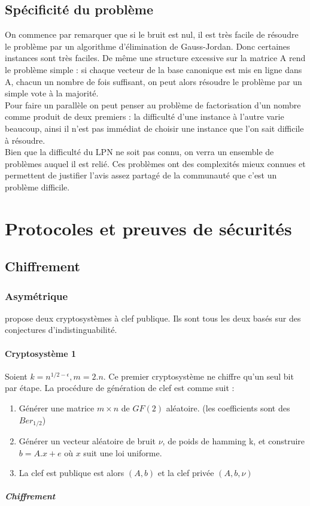 \documentclass{article}		%
\theoremstyle{definition}
\theoremstyle{plain}
\theoremstyle{plain}
\theoremstyle{plain}
\theoremstyle{plain}
\begin{document}
\subsection{Spécificité du problème}
On commence par remarquer que si le bruit est nul, il est très facile de
résoudre le problème par un algorithme d'élimination de Gauss-Jordan.
Donc certaines instances sont très faciles. De même une structure
excessive sur la matrice A rend le problème simple : si chaque vecteur de
la base canonique est mis en ligne dans A, chacun un nombre de fois
suffisant, on peut alors résoudre le problème par un simple vote à la 
majorité.
\\
Pour faire un parallèle on peut penser au problème de factorisation d'un
nombre comme produit de deux premiers : la difficulté d'une instance à
l'autre varie beaucoup, ainsi il n'est pas immédiat de choisir une instance
que l'on sait difficile à résoudre. 
\\
Bien que la difficulté du LPN ne soit pas connu, on verra un ensemble de
problèmes auquel il est relié. Ces problèmes ont des complexités mieux
connues et permettent de justifier l'avis assez partagé de la communauté
que c'est un problème difficile.

\section{Protocoles et preuves de sécurités}
\subsection{Chiffrement}
\subsubsection{Asymétrique}
\cite{Alekh}  propose deux cryptosystèmes à clef publique. Ils sont tous
les deux basés sur des conjectures d'indistinguabilité.
\paragraph{Cryptosystème 1}
Soient $k=n^{1/2-\epsilon}, m=2.n$. Ce premier cryptosystème ne chiffre
qu'un seul bit par étape. La procédure de génération de clef est comme
suit :
\begin{enumerate}
\item Générer une matrice $m\times n$ de $GF(2)$ aléatoire.
(les coefficients sont des $Ber_{1/2}$)
\item Générer un vecteur aléatoire de bruit $\nu$, de poids de hamming k,
et construire $b=A.x+e$ où $x$ suit une loi uniforme.
\item La clef est publique est alors $(A,b)$ et la clef privée
$(A,b,\nu)$
\end{enumerate}
\subparagraph{Chiffrement}
\end{document}
